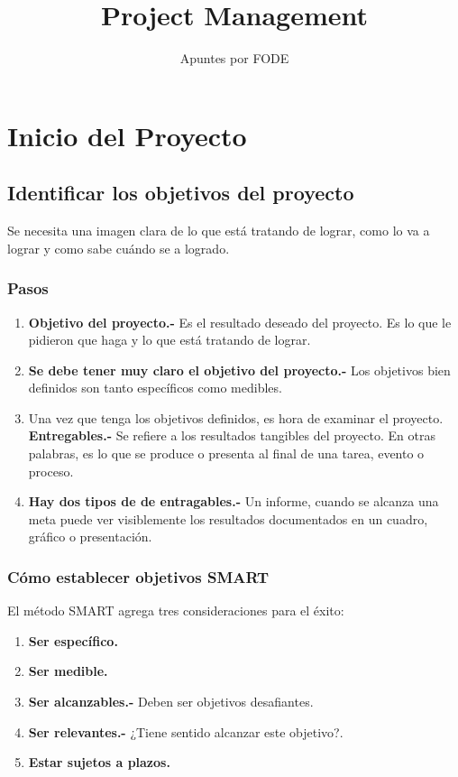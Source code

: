 \documentclass[10pt]{book}
\begin{document}
\normalfont

\author{\Large Apuntes por FODE}
\title{Project Management}
\date{}
\pagestyle{empty}
\maketitle
\thispagestyle{empty}
\let\cleardoublepage\clearpage
\tableofcontents								%


 
\let\cleardoublepage\clearpage

\chapter{Inicio del Proyecto}

    \section{Identificar los objetivos del proyecto}
    Se necesita una imagen clara de lo que está tratando de lograr, como lo va a lograr y como sabe cuándo se a logrado.

    \subsection{Pasos}
    \begin{enumerate}[\bfseries 1.]
	\item \textbf{Objetivo del proyecto.-} Es el resultado deseado del proyecto. Es lo que le pidieron que haga y lo que está tratando de lograr.
	\item \textbf{Se debe tener muy claro el objetivo del proyecto.-} Los objetivos bien definidos son tanto específicos como medibles. 
	\item Una vez que tenga los objetivos definidos, es hora de examinar el proyecto. \textbf{Entregables.-} Se refiere a los resultados tangibles del proyecto. En otras palabras, es lo que se produce o presenta al final de una tarea, evento o proceso. 
	\item \textbf{Hay dos tipos de de entragables.-} Un informe, cuando se alcanza una meta puede ver visiblemente los resultados documentados en un cuadro, gráfico o presentación. 
    \end{enumerate}

    \subsection{Cómo establecer objetivos SMART}
    El método SMART agrega tres consideraciones para el éxito:
    \begin{enumerate}[\bfseries 1.]
	\item \textbf{Ser específico.}
	\item \textbf{Ser medible.}
	\item \textbf{Ser alcanzables.-} Deben ser objetivos desafiantes.
	\item \textbf{Ser relevantes.-} ¿Tiene sentido alcanzar este objetivo?.
	\item \textbf{Estar sujetos a plazos.}\\\\
    \end{enumerate}
\end{document}
